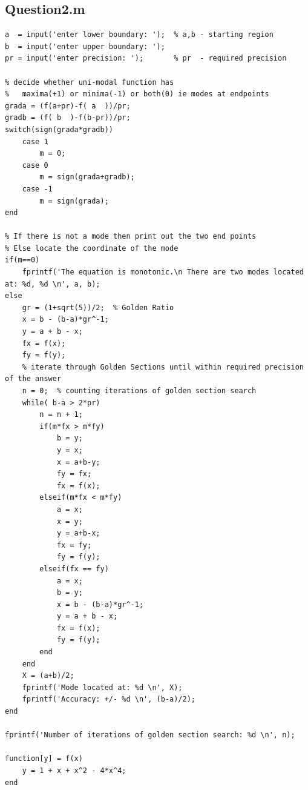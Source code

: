 \documentclass[a4paper]{article}
\begin{document}
\subsection*{Question\textunderscore2.m}
\begin{lstlisting}[style = Matlab-editor]
a  = input('enter lower boundary: ');  % a,b - starting region
b  = input('enter upper boundary: ');
pr = input('enter precision: ');       % pr  - required precision

% decide whether uni-modal function has
%   maxima(+1) or minima(-1) or both(0) ie modes at endpoints
grada = (f(a+pr)-f( a  ))/pr;
gradb = (f( b  )-f(b-pr))/pr;
switch(sign(grada*gradb))
    case 1
        m = 0;
    case 0
        m = sign(grada+gradb);
    case -1
        m = sign(grada);
end

% If there is not a mode then print out the two end points
% Else locate the coordinate of the mode
if(m==0)
    fprintf('The equation is monotonic.\n There are two modes located at: %d, %d \n', a, b);
else
    gr = (1+sqrt(5))/2;  % Golden Ratio
    x = b - (b-a)*gr^-1;
    y = a + b - x;
    fx = f(x);
    fy = f(y);
    % iterate through Golden Sections until within required precision of the answer
    n = 0;  % counting iterations of golden section search
    while( b-a > 2*pr)
        n = n + 1;
        if(m*fx > m*fy)
            b = y;
            y = x;
            x = a+b-y;
            fy = fx;
            fx = f(x);
        elseif(m*fx < m*fy)
            a = x;
            x = y;
            y = a+b-x;
            fx = fy;
            fy = f(y);
        elseif(fx == fy)
            a = x;
            b = y;
            x = b - (b-a)*gr^-1;
            y = a + b - x;
            fx = f(x);
            fy = f(y);
        end    
    end
    X = (a+b)/2;
    fprintf('Mode located at: %d \n', X);
    fprintf('Accuracy: +/- %d \n', (b-a)/2);
end

fprintf('Number of iterations of golden section search: %d \n', n);

function[y] = f(x)
    y = 1 + x + x^2 - 4*x^4;
end

\end{lstlisting}

\pagebreak
\end{document}

